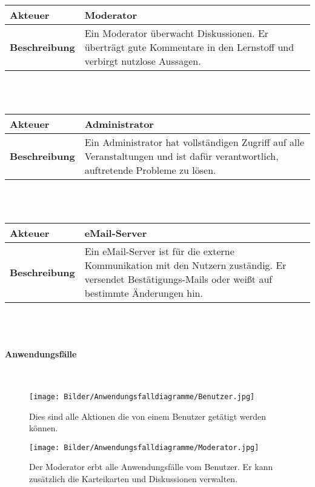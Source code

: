 \documentclass[12pt,a4paper]{article}
\begin{document}
\begin{tabular}{l p{10cm}}
\textbf{Akteuer} & Moderator \\ 
\hline \textbf{Beschreibung} & Ein Moderator überwacht Diskussionen. Er überträgt gute Kommentare in den Lernstoff und verbirgt nutzlose Aussagen.\\ 
\hline 
\end{tabular}\\\\

\begin{tabular}{l p{10cm}}
\textbf{Akteuer} & Administrator \\ 
\hline \textbf{Beschreibung} & Ein Administrator hat vollständigen Zugriff auf alle Veranstaltungen und ist dafür verantwortlich, auftretende Probleme zu lösen. \\ 
\hline 
\end{tabular}\\\\

\begin{tabular}{l p{10cm}}
\textbf{Akteuer} & eMail-Server \\ 
\hline \textbf{Beschreibung} & Ein eMail-Server ist für die externe Kommunikation mit den Nutzern zuständig. Er versendet Bestätigungs-Mails oder weißt auf bestimmte Änderungen hin. \\ 
\hline 
\end{tabular}\\\\

\paragraph{Anwendungsfälle}\mbox{}\\

\begin{figure}[H]
	\centering
	\texttt{[image: Bilder/Anwendungsfalldiagramme/Benutzer.jpg]}
	\caption{Dies sind alle Aktionen die von einem Benutzer getätigt werden können.}
	\label{AwfBenutzer}
\end{figure}

\begin{figure}[H]
	\centering
	\texttt{[image: Bilder/Anwendungsfalldiagramme/Moderator.jpg]}
	\caption{Der Moderator erbt alle Anwendungsfälle vom Benutzer. Er kann zusätzlich die Karteikarten und Diskussionen verwalten.}
	\label{AwfModerator}
\end{figure}
\end{document}
